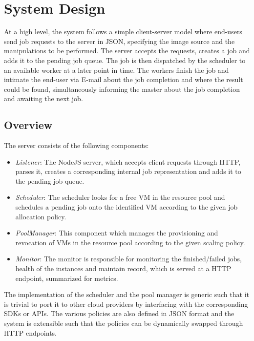 \documentclass[a4paper]{IEEEtran}
\begin{document}
\section{System Design} \label{system_design}

At a high level, the system follows a simple client-server model where end-users send job requests to the server
in JSON, specifying the image source and the manipulations to be performed. The server accepts the requests, creates
a job and adds it to the pending job queue. The job is then dispatched by the scheduler to an available worker at a later point in time. The workers finish the job and intimate the end-user via E-mail about the job completion and 
where the result could be found, simultaneously informing the master about the job completion and awaiting the next job.

\subsection{Overview}

 The server consists of the following components:

 \begin{itemize}
   \item \emph{Listener}: The NodeJS server, which accepts client requests through HTTP, parses it, creates a 
   corresponding internal job representation and adds it to the pending job queue.
   \item \emph{Scheduler}: The scheduler looks for a free VM in the resource pool and schedules a pending job
   onto the identified VM according to the given job allocation policy.
   \item \emph{PoolManager}: This component which manages the provisioning and revocation of VMs in the resource 
   pool according to the given scaling policy.
   \item \emph{Monitor}: The monitor is responsible for monitoring the finished/failed jobs, health of the instances
    and maintain record, which is served at a HTTP endpoint, summarized for metrics.
 \end{itemize}

The implementation of the scheduler and the pool manager is generic such that it is trivial to port it to other 
cloud providers by interfacing with the corresponding SDKs or APIs. The various policies are also defined in JSON
format and the system is extensible such that the policies can be dynamically swapped through HTTP endpoints.
\end{document}
